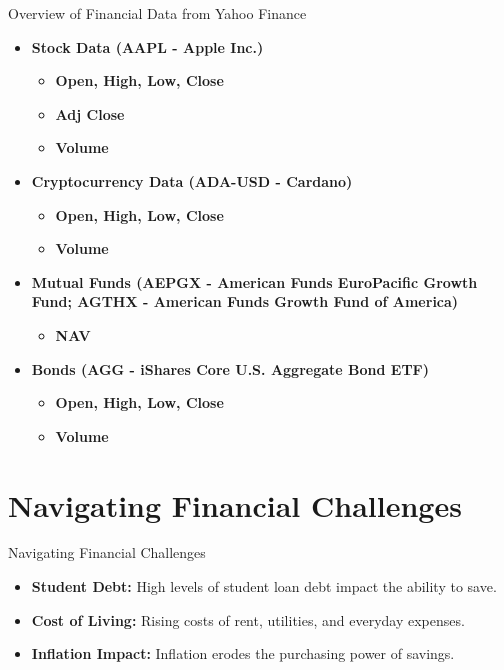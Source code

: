 \documentclass{beamer}
\begin{document}
\begin{frame}{Overview of Financial Data from Yahoo Finance}
    \begin{itemize}
        \item \textbf{Stock Data (AAPL - Apple Inc.)}
        \begin{itemize}
            \item \textbf{Open, High, Low, Close}
            \item \textbf{Adj Close}
            \item \textbf{Volume}
        \end{itemize}
        \item \textbf{Cryptocurrency Data (ADA-USD - Cardano)}
        \begin{itemize}
            \item \textbf{Open, High, Low, Close}
            \item \textbf{Volume}
        \end{itemize}
        \item \textbf{Mutual Funds (AEPGX - American Funds EuroPacific Growth Fund; AGTHX - American Funds Growth Fund of America)}
        \begin{itemize}
            \item \textbf{NAV}
        \end{itemize}
        \item \textbf{Bonds (AGG - iShares Core U.S. Aggregate Bond ETF)}
        \begin{itemize}
            \item \textbf{Open, High, Low, Close}
            \item \textbf{Volume}
        \end{itemize}
    \end{itemize}
\end{frame}

\section{Navigating Financial Challenges}
\begin{frame}{Navigating Financial Challenges}
    \begin{itemize}
        \item \textbf{Student Debt:} High levels of student loan debt impact the ability to save.
        \item \textbf{Cost of Living:} Rising costs of rent, utilities, and everyday expenses.
        \item \textbf{Inflation Impact:} Inflation erodes the purchasing power of savings.
    \end{itemize}
\end{frame}
\end{document}
